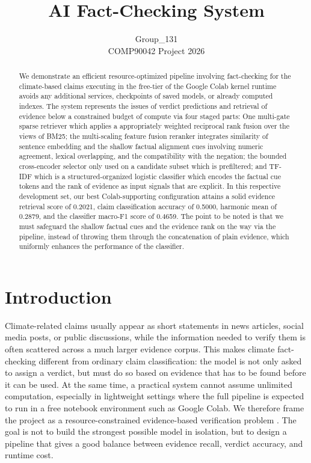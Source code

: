 \documentclass[11pt]{article}
\title{AI Fact-Checking System}
\author{
  Group\_131 \\
  COMP90042 Project 2026
}
\begin{document}
\raggedbottom
\maketitle

\begin{abstract}
We demonstrate an efficient resource-optimized pipeline involving fact-checking 
for the climate-based claims executing in the free-tier of the Google Colab kernel 
runtime avoids any additional services, checkpoints of saved models, or already 
computed indexes. The system represents the issues of verdict predictions and 
retrieval of evidence below a constrained budget of compute via four staged parts: 
One multi-gate sparse retriever which applies a appropriately weighted reciprocal 
rank fusion over the views of BM25; the multi-scaling feature fusion reranker 
integrates similarity of sentence embedding and the shallow factual alignment cues 
involving numeric agreement, lexical overlapping, and the compatibility with the 
negation; the bounded cross-encoder selector only used on a candidate subset which
is prefiltered; and TF-IDF which is a structured-organized logistic classifier which
encodes the factual cue tokens and the rank of evidence as input signals that are
explicit. In this respective development set, our best Colab-supporting configuration 
attains a solid evidence retrieval score of 0.2021, claim classification accuracy of
0.5000, harmonic mean of 0.2879, and the classifier macro-F1 score of 0.4659. The
point to be noted is that we must safeguard the shallow factual cues and the evidence 
rank on the way via the pipeline, instead of throwing them through the concatenation
of plain evidence, which uniformly enhances the performance of the classifier.
\end{abstract}

\section{Introduction}

Climate-related claims usually appear as short statements in news articles,
social media posts, or public discussions, while the information needed to
verify them is often scattered across a much larger evidence corpus. This makes
climate fact-checking different from ordinary claim classification: the model
is not only asked to assign a verdict, but must do so based on evidence that
has to be found before it can be used. At the same time, a practical system
cannot assume unlimited computation, especially in lightweight settings where
the full pipeline is expected to run in a free notebook environment such as
Google Colab. We therefore frame the project as a resource-constrained
evidence-based verification problem \citep{thorne2018fever,diggelmann2020climatefever}.
The goal is not to build the strongest possible model in isolation, but to
design a pipeline that gives a good balance between evidence recall, verdict
accuracy, and runtime cost.
\end{document}
